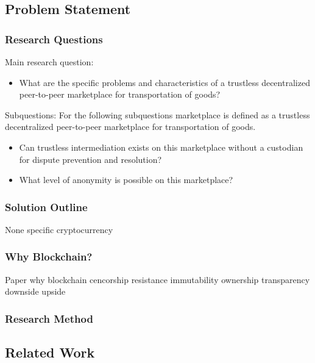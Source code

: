 \documentclass[Nomencl]{DylanMaster}
\begin{document}
\subsection{Problem Statement}

\subsubsection{Research Questions}

\bigbreak
\noindent Main research question:
\begin{itemize}
  \item What are the specific problems and characteristics of a trustless decentralized peer-to-peer marketplace for transportation of goods?
\end{itemize}
\bigbreak
\noindent Subquestions:
\bigbreak
\noindent For the following subquestions marketplace is defined as a trustless decentralized peer-to-peer marketplace for transportation of goods.
\begin{itemize}
  \item Can trustless intermediation exists on this marketplace without a custodian for dispute prevention and resolution?
  \item What level of anonymity is possible on this marketplace?
\end{itemize}

\subsubsection{Solution Outline}

None specific cryptocurrency

\subsubsection{Why Blockchain?}

Paper why blockchain
cencorship resistance
immutability
ownership
transparency
downside
upside

\subsubsection{Research Method}

\subsection{Related Work}
\end{document}
